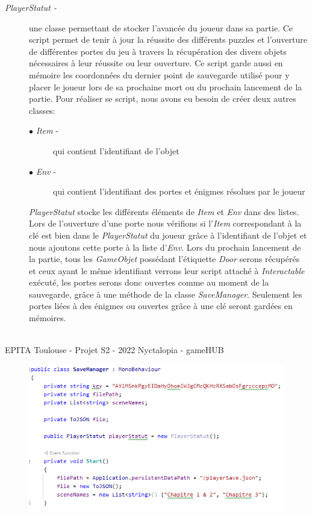 \begin{description}
  \item[\emph{PlayerStatut -}] une classe permettant de stocker l’avancée du joueur dans sa partie. Ce script permet de tenir à jour la réussite des différents puzzles et l’ouverture de différentes portes du jeu à travers la récupération des divers objets nécessaires à leur réussite ou leur ouverture. Ce script garde aussi en mémoire les coordonnées du dernier point de sauvegarde utilisé pour y placer le joueur lors de sa prochaine mort ou du prochain lancement de la partie.
  Pour réaliser se script, nous avons eu besoin de créer deux autres classes:
  \begin{description}
    \item[$\bullet$ \emph{Item} -] qui contient l’identifiant de l’objet
    \item[$\bullet$ \emph{Env} -] qui contient l’identifiant des portes et énigmes résolues par le joueur
\end{description}
\emph{PlayerStatut} stocke les différents éléments de \emph{Item} et \emph{Env} dans des listes.
Lors de l’ouverture d’une porte nous vérifions si l’\emph{Item} correspondant à la clé est bien dans le \emph{PlayerStatut} du joueur grâce à l'identifiant de l'objet et nous ajoutons cette porte à la liste d’\emph{Env}. Lors du prochain lancement de la partie, tous les \emph{GameObjet} possédant l'étiquette \emph{Door} serons récupérés et ceux ayant le même identifiant verrons leur script attaché à \emph{Interactable} exécuté, les portes serons donc ouvertes comme au moment de la sauvegarde, grâce à une méthode de la classe \emph{SaveManager}. Seulement les portes liées à des énigmes ou ouvertes grâce à une clé seront gardées en mémoires.
\end{description}

\vfill
\noindent\makebox[\linewidth]{\rule{.8\paperwidth}{.6pt}}\\[0.2cm]
EPITA Toulouse - Projet S2 - 2022 \hfill Nyctalopia - gameHUB
\noindent\makebox[\linewidth]{\rule{.8\paperwidth}{.6pt}}
\newpage

\begin{figure}[H]
\centering
\begin{minipage}{.5\textwidth}
  \centering
  \centerline{\includegraphics[width=1.5\linewidth]{img/gameplay/Savamanager.PNG}}
  \label{fig:octobercrowfont}
\end{minipage}%
\end{figure}

